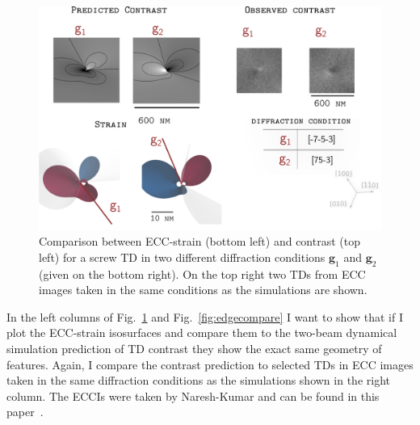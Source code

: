 \begin{figure}[ht]
    \centering
    \includegraphics[width=0.7\linewidth]{Figures/screwcompare.png}
    \caption[ECC-strain vs contrast for a screw TD]{  Comparison between ECC-strain (bottom left) and contrast (top left) for a screw TD in two different diffraction conditions $\textbf{g}_1$ and $\textbf{g}_2$ (given on the bottom right). On the top right two TDs from ECC images taken in the same conditions as the simulations are shown.}
    \label{fig:screwcompare}
\end{figure}


In the left columns of Fig.~\ref{fig:screwcompare} and Fig.~\ref{fig:edgecompare} I want to show that if I plot the ECC-strain isosurfaces and compare them to the two-beam dynamical simulation prediction of TD contrast they show the exact same geometry of features.  Again, I compare the contrast prediction to selected TDs in ECC images taken in the same diffraction conditions as the simulations shown in the right column.  The ECCIs were taken by Naresh-Kumar and can be found in this paper~\cite{Naresh}.

